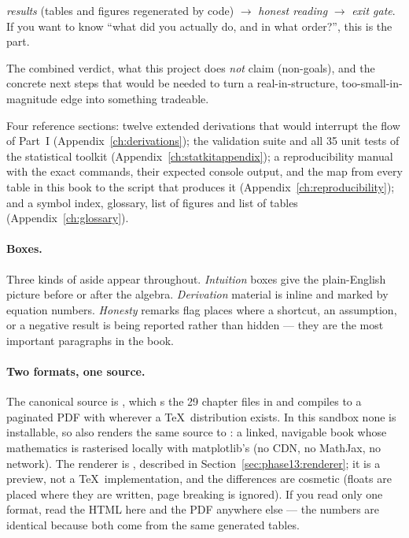 \begin{description}[leftmargin=0pt,style=nextline]
    \emph{results} (tables and figures regenerated by code) $\rightarrow$
    \emph{honest reading} $\rightarrow$ \emph{exit gate}. If you want to know ``what did
    you actually do, and in what order?'', this is the part.
  \item[Part III --- Synthesis.] The combined verdict, what this project does
    \emph{not} claim (non-goals), and the concrete next steps that would be needed to
    turn a real-in-structure, too-small-in-magnitude edge into something tradeable.
  \item[Appendices.] Four reference sections: twelve extended derivations that would
    interrupt the flow of Part~I (Appendix~\ref{ch:derivations}); the validation suite and
    all 35 unit tests of the statistical toolkit (Appendix~\ref{ch:statkitappendix}); a
    reproducibility manual with the exact commands, their expected console output, and the
    map from every table in this book to the script that produces it
    (Appendix~\ref{ch:reproducibility}); and a symbol index, glossary, list of figures and
    list of tables (Appendix~\ref{ch:glossary}).
\end{description}

\paragraph{Boxes.} Three kinds of aside appear throughout.
\emph{Intuition} boxes give the plain-English picture before or after the algebra.
\emph{Derivation} material is inline and marked by equation numbers.
\emph{Honesty} remarks flag places where a shortcut, an assumption, or a negative
result is being reported rather than hidden --- they are the most important paragraphs
in the book.

\paragraph{Two formats, one source.} The canonical source is
, which s the 29 chapter files in
 and compiles to a paginated PDF with  wherever
a \TeX\ distribution exists. In this sandbox none is installable, so
 also renders the same source to
: a linked, navigable book whose mathematics is rasterised locally
with matplotlib's  (no CDN, no MathJax, no network). The renderer is
, described in Section~\ref{sec:phase13:renderer}; it is
a preview, not a \TeX\ implementation, and the differences are cosmetic (floats are placed
where they are written, page breaking is ignored). If you read only one format, read the
HTML here and the PDF anywhere else --- the numbers are identical because both come from the
same generated tables.


